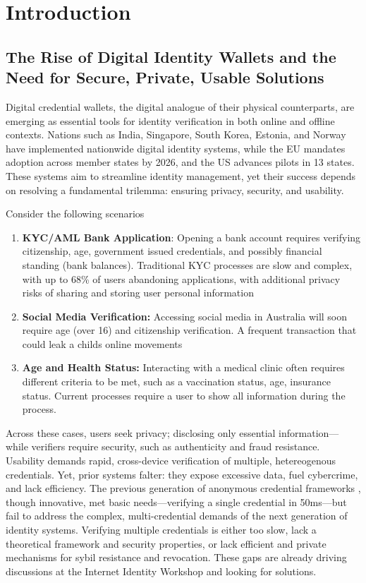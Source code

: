 \chapter{Introduction}

\section{The Rise of Digital Identity Wallets and the Need for Secure, Private, Usable Solutions}
Digital credential wallets, the digital analogue of their physical counterparts, are emerging as essential tools for identity verification in both online and offline contexts. Nations such as India, Singapore, South Korea, Estonia, and Norway have implemented nationwide digital identity systems, while the EU mandates adoption across member states by 2026, and the US advances pilots in 13 states.  These systems aim to streamline identity management, yet their success depends on resolving a fundamental trilemma: ensuring privacy, security, and usability.

Consider the following scenarios
\begin{enumerate}
    \item \textbf{KYC/AML Bank Application}: Opening a bank account requires verifying citizenship, age, government issued credentials, and possibly financial standing (bank balances). Traditional KYC processes are slow and complex, with up to 68\% of users abandoning applications, with additional privacy risks of sharing and storing user personal information

    \item \textbf{Social Media Verification:} Accessing social media in Australia will soon require age (over 16) and citizenship verification. A frequent transaction that could leak a childs online movements 

    \item \textbf{Age and Health Status: } Interacting with a medical clinic often requires different criteria to be met, such as a vaccination status, age, insurance status. Current processes require a user to show all information during the process. 
\end{enumerate}

Across these cases, users seek privacy; disclosing only essential information—while verifiers require security, such as authenticity and fraud resistance. Usability demands rapid, cross-device verification of multiple, hetereogenous credentials. Yet, prior systems falter: they expose excessive data, fuel cybercrime, and lack efficiency. The previous generation of anonymous credential frameworks \cite{hutchison_signature_2004, hutchison_constant-size_2006, sako_short_2016}, though innovative, met basic needs—verifying a single credential in 50ms—but fail to address the complex, multi-credential demands of the next generation of identity systems. Verifying multiple credentials is either too slow, lack a theoretical framework and security properties, or lack efficient and private mechanisms for sybil resistance and revocation. These gaps are already driving discussions at the Internet Identity Workshop \cite{internet_identity_workshop_internet_nodate} and looking for solutions.

